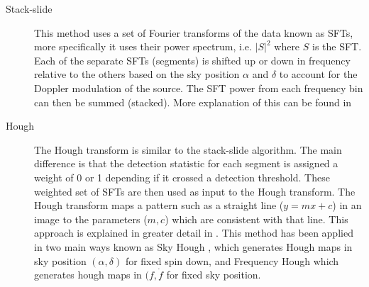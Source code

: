 \begin{description}
	
        \item[Stack-slide] This method uses a set of Fourier
transforms of the data known as \glspl{SFT}, more specifically it uses their power
spectrum, i.e. $|S|^2$ where $S$ is the \gls{SFT}. Each of the separate
\glspl{SFT} (segments) is shifted up or down in frequency relative
to the others based on the sky position $\alpha$ and $\delta$ to account for the Doppler modulation of the source. The \gls{SFT}
power from each frequency bin can then be summed (stacked). More explanation of this can be found in
\citep{brady2000SearchingPeriodic, cutler2005ImprovedStackslide}  
	
        \item[Hough] The Hough transform is similar to the stack-slide algorithm.
The main difference is that the detection statistic for each segment is
assigned a weight of 0 or 1 depending if it crossed a detection threshold. These weighted set of \glspl{SFT} are then used as input to the Hough transform.
The Hough transform maps a pattern such as a straight line ($y=mx + c$) in an image to the parameters ($m,c$) which are consistent with that line.
This approach is explained in greater detail in
\citep{krishnan2004HoughTransform,antonucci2008DetectionPeriodic}.  This method
has been applied in two main ways known as Sky Hough
\citep{krishnan2004HoughTransform}, which generates Hough maps in sky position $(\alpha,\delta)$ for fixed spin down, and Frequency Hough
\citep{antonucci2008DetectionPeriodic,astone2014MethodAllsky} which generates hough maps in $(f,\dot{f}$ for fixed sky position.
	

\end{description}
